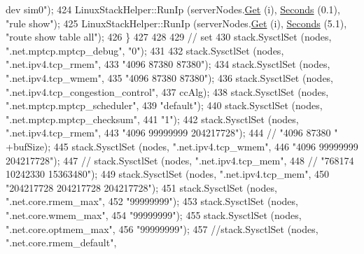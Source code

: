 \begin{DoxyCode}
{{{{       dev sim0");}
424     LinuxStackHelper::RunIp (serverNodes.\hyperlink{classns3_1_1NodeContainer_a9ed96e2ecc22e0f5a3d4842eb9bf90bf}{Get} (i), \hyperlink{group__timecivil_ga33c34b816f8ff6628e33d5c8e9713b9e}{Seconds} (0.1), \textcolor{stringliteral}{"rule show"});
425     LinuxStackHelper::RunIp (serverNodes.\hyperlink{classns3_1_1NodeContainer_a9ed96e2ecc22e0f5a3d4842eb9bf90bf}{Get} (i), \hyperlink{group__timecivil_ga33c34b816f8ff6628e33d5c8e9713b9e}{Seconds} (5.1), \textcolor{stringliteral}{"route show table all"});
426   \}
427   
428 
429   \textcolor{comment}{// set}
430   stack.SysctlSet (nodes, \textcolor{stringliteral}{".net.mptcp.mptcp\_debug"}, \textcolor{stringliteral}{"0"});
431 
432   stack.SysctlSet (nodes, \textcolor{stringliteral}{".net.ipv4.tcp\_rmem"},
433                    \textcolor{stringliteral}{"4096 87380 87380"});
434   stack.SysctlSet (nodes, \textcolor{stringliteral}{".net.ipv4.tcp\_wmem"},
435                    \textcolor{stringliteral}{"4096 87380 87380"});
436   stack.SysctlSet (nodes, \textcolor{stringliteral}{".net.ipv4.tcp\_congestion\_control"},
437                    ccAlg);
438   stack.SysctlSet (nodes, \textcolor{stringliteral}{".net.mptcp.mptcp\_scheduler"},
439                    \textcolor{stringliteral}{"default"});
440   stack.SysctlSet (nodes, \textcolor{stringliteral}{".net.mptcp.mptcp\_checksum"},
441                     \textcolor{stringliteral}{"1"});
442   stack.SysctlSet (nodes, \textcolor{stringliteral}{".net.ipv4.tcp\_rmem"},
443                    \textcolor{stringliteral}{"4096 99999999 204217728"});
444   \textcolor{comment}{//                       "4096 87380 " +bufSize);}
445   stack.SysctlSet (nodes, \textcolor{stringliteral}{".net.ipv4.tcp\_wmem"},
446                    \textcolor{stringliteral}{"4096 99999999 204217728"});
447   \textcolor{comment}{// stack.SysctlSet (nodes, ".net.ipv4.tcp\_mem",}
448   \textcolor{comment}{//                  "768174 10242330 15363480");}
449   stack.SysctlSet (nodes, \textcolor{stringliteral}{".net.ipv4.tcp\_mem"},
450                    \textcolor{stringliteral}{"204217728 204217728 204217728"});
451   stack.SysctlSet (nodes, \textcolor{stringliteral}{".net.core.rmem\_max"},
452                    \textcolor{stringliteral}{"99999999"});
453   stack.SysctlSet (nodes, \textcolor{stringliteral}{".net.core.wmem\_max"},
454                    \textcolor{stringliteral}{"99999999"});
455   stack.SysctlSet (nodes, \textcolor{stringliteral}{".net.core.optmem\_max"},
456                    \textcolor{stringliteral}{"99999999"});
457   \textcolor{comment}{//stack.SysctlSet (nodes, ".net.core.rmem\_default",}
}}}
\end{DoxyCode}

